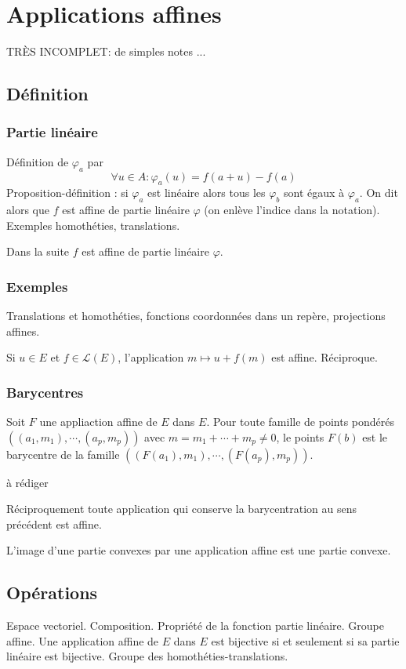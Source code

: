 \section{Applications affines}
TR\`ES  INCOMPLET: de simples notes ...
\subsection{Définition}
\subsubsection{Partie linéaire}
Définition de $\varphi_a$ par 
\begin{displaymath}
 \forall u\in A : \varphi_a(u)=f(a+u)-f(a)
\end{displaymath}
Proposition-définition : si $\varphi_a$ est linéaire alors tous les $\varphi_b$ sont égaux à $\varphi_a$. On dit alors que $f$ est affine de partie linéaire $\varphi$ (on enlève l'indice dans la notation).
Exemples homothéties, translations.

Dans la suite $f$ est affine de partie linéaire $\varphi$.

\subsubsection{Exemples}
Translations et homothéties, fonctions coordonnées dans un repère, projections affines.

Si $u\in E$ et $f\in \mathcal L(E)$, l'application $m \mapsto u+f(m)$ est affine. Réciproque.
\subsubsection{Barycentres}
\begin{prop}
 Soit $F$ une appliaction affine de $E$ dans $E$. Pour toute famille de points pondérés $\left((a_1,m_1),\cdots,(a_p,m_p) \right)$ avec $m=m_1+\cdots+m_p\neq0$, le points $F(b)$ est le barycentre de la famille $\left((F(a_1),m_1),\cdots,(F(a_p),m_p) \right)$.  
\end{prop}
\begin{demo}
 à rédiger
\end{demo}
Réciproquement toute application qui conserve la barycentration au sens précédent est  affine.

L'image d'une partie convexes par une application affine est une partie convexe.
\subsection{Opérations}
Espace vectoriel. Composition. Propriété de la fonction partie linéaire. Groupe affine. Une application affine de $E$ dans $E$ est bijective si et seulement si sa partie linéaire est bijective. Groupe des homothéties-translations.

